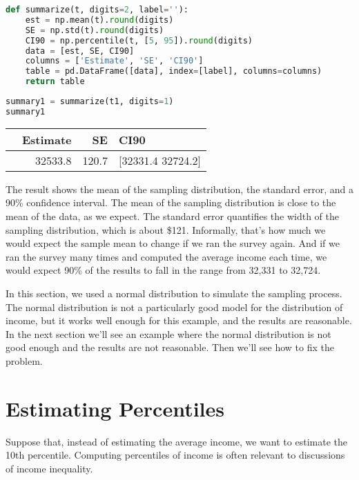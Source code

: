 \begin{lstlisting}[language=Python,style=source]
def summarize(t, digits=2, label=''):
    est = np.mean(t).round(digits)
    SE = np.std(t).round(digits)
    CI90 = np.percentile(t, [5, 95]).round(digits)
    data = [est, SE, CI90]
    columns = ['Estimate', 'SE', 'CI90']
    table = pd.DataFrame([data], index=[label], columns=columns)
    return table
\end{lstlisting}

\begin{lstlisting}[language=Python,style=source]
summary1 = summarize(t1, digits=1)
summary1
\end{lstlisting}

\begin{tabular}{lrrl}
\toprule
 & Estimate & SE & CI90 \\
\midrule
 & 32533.8 & 120.7 & [32331.4 32724.2] \\
\bottomrule
\end{tabular}

The result shows the mean of the sampling distribution, the standard
error, and a 90\% confidence interval. The mean of the sampling
distribution is close to the mean of the data, as we expect. The
standard error quantifies the width of the sampling distribution, which
is about \$121. Informally, that's how much we would expect the sample
mean to change if we ran the survey again. And if we ran the survey many
times and computed the average income each time, we would expect 90\% of
the results to fall in the range from 32,331 to 32,724.

In this section, we used a normal distribution to simulate the sampling
process. The normal distribution is not a particularly good model for
the distribution of income, but it works well enough for this example,
and the results are reasonable. In the next section we'll see an example
where the normal distribution is not good enough and the results are not
reasonable. Then we'll see how to fix the problem.

\section{Estimating Percentiles}\label{estimating-percentiles}

Suppose that, instead of estimating the average income, we want to
estimate the 10th percentile. Computing percentiles of income is often
relevant to discussions of income inequality.

